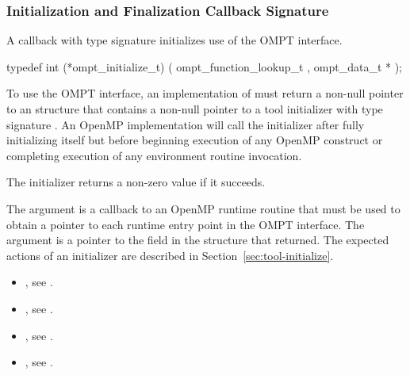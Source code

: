 \subsubsection{Initialization and Finalization Callback Signature}

\label{sec:ompt_initialize_t}

\summary
A callback with type signature  initializes 
use of the OMPT interface.

\format

\begin{ccppspecific}
\begin{omptInquiry}
typedef int (*ompt_initialize_t) (
  ompt_function_lookup_t ,
  ompt_data_t *
);
\end{omptInquiry}
\end{ccppspecific}


\descr
To use the OMPT interface, an implementation of  must 
return a non-null pointer to an  structure 
that contains a non-null pointer to a tool initializer with type signature 
. An OpenMP implementation will call the initializer
after fully initializing itself but before beginning execution of any OpenMP 
construct or completing execution of any environment routine invocation.

The initializer returns a non-zero value if it succeeds.

\argdesc
The  argument is a callback to an OpenMP runtime routine that 
must be used to obtain a pointer to each runtime entry point in the OMPT 
interface. The  argument is a pointer to the  
field in the  structure that 
returned. The expected actions of an initializer are described in 
Section~\ref{sec:tool-initialize}.

\crossreferences
\begin{itemize}
\item {}, see
.

\item {}, see .

\item {}, see
.

\item {}, see .
\end{itemize}



